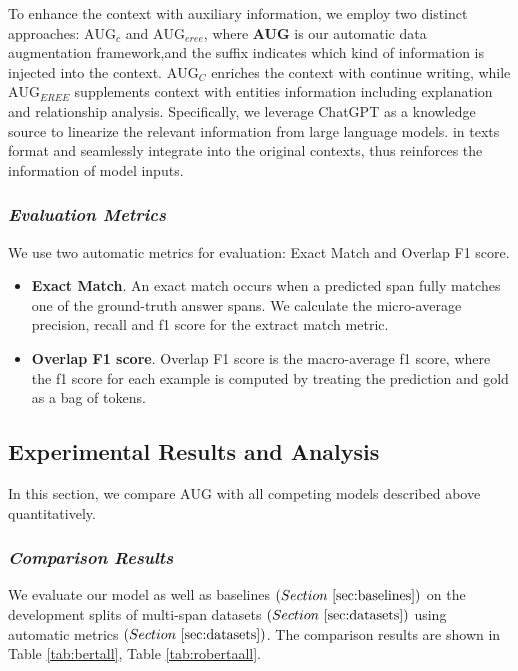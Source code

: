To enhance the context with auxiliary information, we employ two distinct   approaches: \textbf{$\text{AUG}_{c}$} and \textbf{$\text{AUG}_{eree}$}, where \textbf{AUG} is our automatic data augmentation framework,and the suffix indicates which kind of information is injected into the context. \textbf{$\text{AUG}_{C}$} enriches the context with continue writing, while \textbf{$\text{AUG}_{EREE}$} supplements context with entities information including explanation and relationship analysis.
Specifically, we leverage ChatGPT as a knowledge source to linearize the relevant information from large language models. in texts format and seamlessly integrate into the original contexts, thus reinforces the information of model inputs.


\subsubsection{\textit{Evaluation Metrics}}
\label{sec:metrics}
We use two automatic metrics for evaluation: Exact Match and Overlap F1 score.
\begin{itemize}
	\item \textbf{Exact Match}. An exact match occurs when a predicted span fully matches one of the ground-truth
	answer spans. We calculate the micro-average precision, recall and f1 score for the extract match
	metric.
	
	\item \textbf{Overlap F1 score}. Overlap F1 score is the macro-average f1 score, where the f1 score for each
	example is computed by treating the prediction and gold as a bag of tokens.
\end{itemize}


\subsection{Experimental Results and Analysis}
In this section, we compare $\text{AUG}$ with all competing models described above quantitatively.

\subsubsection{\textit{Comparison Results}}
We evaluate our model as well as baselines 
\(( Section ~\ref{sec:baselines} )\) on the development splits of multi-span datasets \(( Section  ~\ref{sec:datasets})\) using automatic metrics \(( Section ~\ref{sec:datasets})\). The comparison results are shown in Table \ref{tab:bertall}, Table \ref{tab:robertaall}.

